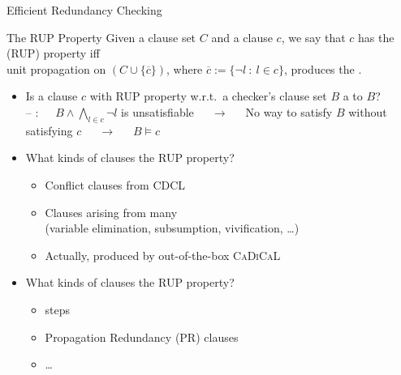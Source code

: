 \documentclass[t,english]{sdqbeamer}
\begin{document}
\begin{frame}{Efficient Redundancy Checking~\cite{van2008verifying}}
	
	\vspace*{-2mm}
	\begin{blueblock}{The RUP Property}
		Given a clause set $C$ and a clause $c$, we say that $c$ has the  (RUP) property iff\\
		unit propagation on $(C \cup \{\overline{c}\})$, where $\overline{c} := \{ \neg l\ :\ l \in c \}$, produces the .
	\end{blueblock}
	\begin{itemize}\setlength{\itemsep}{3mm}
		\item Is a clause $c$ with RUP property w.r.t.\ a checker's clause set $B$ a  to $B$?\\
		\pause
		-- :\ \ \ $B \wedge \bigwedge_{l \in c} \neg l$ is unsatisfiable\ \ \ $\rightarrow$\ \ \ No way to satisfy $B$ without satisfying $c$\ \ \ $\rightarrow$\ \ \ $B \models c$
		\pause
		\item What kinds of clauses  the RUP property?
		\begin{itemize}
			\item Conflict clauses from CDCL
			\item Clauses arising from many \\
			(variable elimination, subsumption, vivification, \ldots)
			\item Actually,  produced by out-of-the-box \textsc{CaDiCaL}
		\end{itemize}
		\pause
		\item What kinds of clauses  the RUP property?
		\begin{itemize}
			\item {} steps
			\item Propagation Redundancy (PR) clauses
			\item \ldots
		\end{itemize}
	\end{itemize}
\end{frame}

\newcommand{\beginalgo}{\hrule\vspace*{2mm}}
\newcommand{\finishalgo}{\vspace*{2mm}\hrule}
\end{document}
